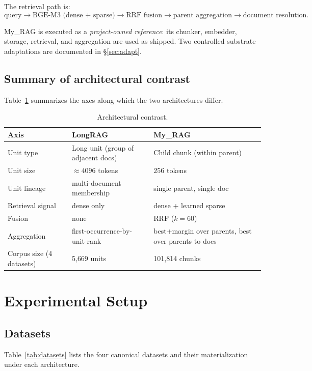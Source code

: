 \documentclass[11pt,a4paper]{article}
\begin{document}
The retrieval path is:
\[
\text{query} \to
\text{BGE-M3 (dense + sparse)} \to
\text{RRF fusion} \to
\text{parent aggregation} \to
\text{document resolution}.
\]

My\_RAG is executed as a \emph{project-owned reference}: its
chunker, embedder, storage, retrieval, and aggregation are used as
shipped. Two controlled substrate adaptations are documented in
\S\ref{sec:adapt}.

\subsection{Summary of architectural contrast}
Table~\ref{tab:arch} summarizes the axes along which the two
architectures differ.

\begin{table}[h]
\centering
\caption{Architectural contrast.}
\label{tab:arch}
\small
\begin{tabular}{p{3.5cm} p{5.5cm} p{5.5cm}}
\toprule
\textbf{Axis} & \textbf{LongRAG} & \textbf{My\_RAG} \\
\midrule
Unit type & Long unit (group of adjacent docs) & Child chunk (within parent) \\
Unit size & $\approx 4096$ tokens & $256$ tokens \\
Unit lineage & multi-document membership & single parent, single doc \\
Retrieval signal & dense only & dense + learned sparse \\
Fusion & none & RRF ($k=60$) \\
Aggregation & first-occurrence-by-unit-rank & best+margin over parents, best over parents to docs \\
Corpus size (4 datasets) & 5{,}669 units & 101{,}814 chunks \\
\bottomrule
\end{tabular}
\end{table}

\section{Experimental Setup}\label{sec:setup}

\subsection{Datasets}
Table~\ref{tab:datasets} lists the four canonical datasets and their
materialization under each architecture.
\end{document}
